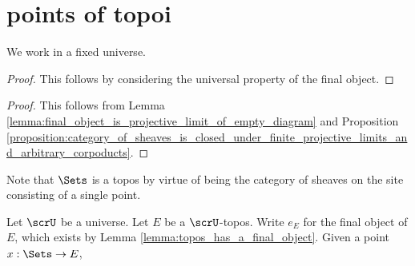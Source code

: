 



\section{points of topoi}

We work in a fixed universe.

\begin{definition}
    
\end{definition}




\begin{proof}
    This follows by considering the universal property of the final object.
\end{proof}


\begin{proof}
    This follows from Lemma \ref{lemma:final_object_is_projective_limit_of_empty_diagram} and Proposition \ref{proposition:category_of_sheaves_is_closed_under_finite_projective_limits_and_arbitrary_corpoducts}.
\end{proof}



Note that $\Sets$ is a topos by virtue of being the category of sheaves on the site consisting of a single point.

 





\begin{lemma}
Let $\scrU$ be a universe. Let $E$ be a $\scrU$-topos. Write $e_E$ for the final object of $E$, which exists by Lemma \ref{lemma:topos_has_a_final_object}. Given a point $x: \Sets \to E$,     
\end{lemma}

